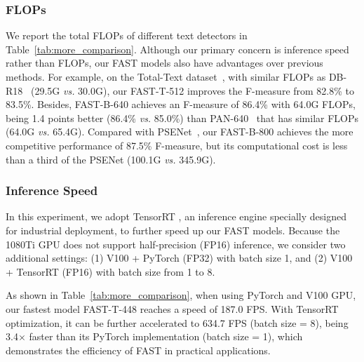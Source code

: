 \documentclass[lettersize,journal]{IEEEtran}
\begin{document}
\subsubsection{FLOPs}
We report the total FLOPs of different text detectors in Table~\ref{tab:more_comparison}. Although our primary concern is inference speed rather than FLOPs, our FAST models also have advantages over previous methods. 
For example, on the Total-Text dataset~\cite{ch2017total}, with similar FLOPs as DB-R18~\cite{liao2020real} (29.5G \emph{vs.} 30.0G), our FAST-T-512 improves the F-measure from 82.8\% to 83.5\%.
Besides,
FAST-B-640 achieves an F-measure of 86.4\% with 64.0G FLOPs, being 1.4 points better (86.4\% \emph{vs.} 85.0\%) than PAN-640~\cite{wang2019efficient} that has similar FLOPs (64.0G \emph{vs.} 65.4G).
Compared with PSENet~\cite{wang2019shape}, our FAST-B-800 achieves the more competitive performance of 87.5\% F-measure, but its computational cost is less than a third of the PSENet (100.1G \emph{vs.} 345.9G).

\subsubsection{Inference Speed}
In this experiment, we adopt TensorRT \cite{vanholder2016efficient}, an inference engine specially designed for industrial deployment, to further speed up our FAST models.
Because the 1080Ti GPU does not support half-precision (FP16) inference, we consider two additional settings: (1) V100 + PyTorch (FP32) with batch size 1, and (2) V100 + TensorRT (FP16) with batch size from 1 to 8. 

As shown in Table~\ref{tab:more_comparison}, when using PyTorch and V100 GPU, our fastest model FAST-T-448 reaches a speed of 187.0 FPS.
With TensorRT optimization, it can be further accelerated to 634.7 FPS (batch size = 8), being 3.4$\times$ faster than its PyTorch implementation (batch size = 1), which demonstrates the efficiency of FAST in practical applications.
\end{document}
